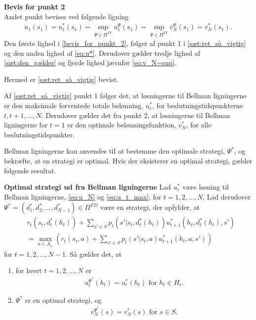 \begin{bev}
\textbf{Bevis for punkt 2}\\
Andet punkt bevises ved følgende ligning
\begin{align} \label{bevis_for_punkt_2}
    u_1(s_1)=u_1^*(s_1)=\sup_{\Psi\in \Pi^{FT}}u_1^\Psi(s_1)=\sup_{\Psi\in \Pi^{FT}}v_N^\Psi(s_1)=v_N^*(s_1).
\end{align}
Den første lighed i \eqref{bevis_for_punkt_2}, følger af punkt 1 i \autoref{sæt:ret_så_vigtig} og den anden lighed af \eqref{eq:u*}. Derudover gælder tredje lighed af \autoref{sæt:den_gælder} og fjerde lighed jævnfør \eqref{eq:v_N=sup}.

Hermed er \autoref{sæt:ret_så_vigtig} bevist.
\end{bev}

Af \autoref{sæt:ret_så_vigtig} punkt 1 følger det, at løsningerne til Bellman ligningerne er den maksimale forventede totale belønning, $u_t^*$, for beslutningstidspunkterne $t, t+1, \ldots, N$.
Derudover gælder det fra punkt 2, at løsningerne til Bellman ligningerne for $t=1$ er den optimale belønningsfunktion, $v_N^*$, for alle beslutningstidspunkter. %

Bellman ligningerne kan anvendes til at bestemme den optimale strategi, $\Psi^*$, og bekræfte, at en strategi er optimal. Hvis der eksisterer en optimal strategi, gælder følgende resultat.

\begin{minipage}\textwidth
\begin{thmx}\label{sæt:optimal_strategi_ved_Bellman} \textbf{Optimal strategi ud fra Bellman ligningerne} %
\newline
Lad $u_t^*$ være løsning til Bellman ligningerne, \eqref{eq:u_N} og \eqref{eq:u_t_max}, for $t=1,2, \ldots, N$. Lad derudover $\Psi^*=(d_1^*, d_2^*, \ldots, d_{N-1}^*)\in \Pi^{FD}$ være en strategi, der opfylder, at
\begin{align}\label{eq:optimal_strategi}
    &r_t\left(s_t, d_t^*(h_t)\right)+\sum_{s'\in S}p_t\left(s'|s_t, d_t^*(h_t)\right)u_{t+1}^*\left(h_t, d_t^*(h_t), s'\right)\nonumber\\
    &=\max_{a\in A_{s_t}}\left(r_t(s_t,a)+\sum_{s'\in S}p_t(s'|s_t, a)u_{t+1}^*(h_t, a, s')\right)
\end{align}
for $t=1, 2, \ldots, N-1$.
Så gælder det, at
\begin{enumerate}
    \item for hvert $t = 1, 2, \ldots, N$ er
    \begin{align*}
        u_t^{\Psi^*}(h_t) = u_t^*(h_t) \text{ for } h_t \in H_t.
    \end{align*}
    \item $\Psi^*$ er en optimal strategi, og 
    \begin{align*}
      v_N^{\Psi^*}(s)  = v_N^*(s) \text{ for } s \in S.
    \end{align*}
\end{enumerate}
\end{thmx}
\end{minipage}

